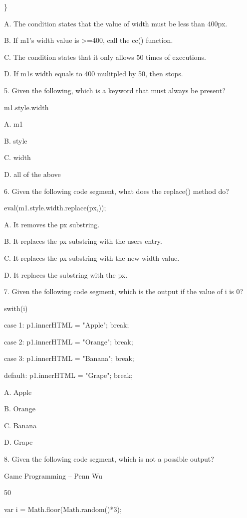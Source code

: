 \documentclass[
]{article}
\begin{document}
\}

A. The condition states that the value of width must be less than 400px.

B. If m1's width value is \textgreater=400, call the cc() function.

C. The condition states that it only allows 50 times of executions.

D. If m1\textquotesingle s width equals to 400 mulitpled by 50, then
stops.

5. Given the following, which is a keyword that must always be present?

m1.style.width

A. m1

B. style

C. width

D. all of the above

6. Given the following code segment, what does the replace() method do?

eval(m1.style.width.replace(\textquotesingle px\textquotesingle,\textquotesingle\textquotesingle));

A. It removes the \textquotesingle px\textquotesingle{} substring.

B. It replaces the \textquotesingle px\textquotesingle{} substring with
the user\textquotesingle s entry.

C. It replaces the \textquotesingle px\textquotesingle{} substring with
the new width value.

D. It replaces the \textquotesingle{} substring with the
\textquotesingle px\textquotesingle.

7. Given the following code segment, which is the output if the value of
i is 0?

swith(i)

case 1: p1.innerHTML = "Apple"; break;

case 2: p1.innerHTML = "Orange"; break;

case 3: p1.innerHTML = "Banana"; break;

default: p1.innerHTML = "Grape"; break;

A. Apple

B. Orange

C. Banana

D. Grape

8. Given the following code segment, which is not a possible output?

Game Programming -- Penn Wu

50

\protect\hypertarget{index_split_004.htmlux5cux23p51}{}{}var i =
Math.floor(Math.random()*3);
\end{document}
